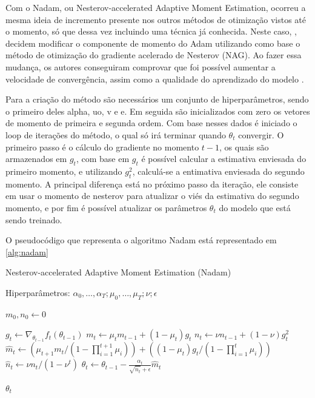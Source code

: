 Com o Nadam, ou Nesterov-accelerated Adaptive Moment Estimation, ocorreu a mesma ideia de incremento presente nos outros métodos de otimização vistos até o momento, só que dessa vez incluindo uma técnica já conhecida. Neste caso, \textcite{NadamMethod}, decidem modificar o componente de momento do Adam utilizando como base o método de otimização do gradiente acelerado de Nesterov (NAG). Ao fazer essa mudança, os autores conseguiram comprovar que foi possível aumentar a velocidade de convergência, assim como a qualidade do aprendizado do modelo \parencite{NadamMethod}.

Para a criação do método são necessários um conjunto de hiperparâmetros, sendo o primeiro deles alpha, uo, v e e. Em seguida são inicializados com zero os vetores de momento de primeira e segunda ordem. Com base nesses dados é iniciado o loop de iterações do método, o qual só irá terminar quando $\theta_t$ convergir. O primeiro passo é o cálculo do gradiente no momento $t-1$, os quais são armazenados em $g_t$, com base em $g_t$ é possível calcular a estimativa enviesada do primeiro momento, e utilizando $g_t^2$, calculá-se a entimativa enviesada do segundo momento. A principal diferença está no próximo passo da iteração, ele consiste em usar o momento de nesterov para atualizar o viés da estimativa do segundo momento, e por fim é possível atualizar os parâmetros $\theta_t$ do modelo que está sendo treinado.

O pseudocódigo que representa o algoritmo Nadam está representado em \ref{alg:nadam}

\begin{algorithm}[H] %
\caption{Nesterov-accelerated Adaptive Moment Estimation (Nadam)}
\label{alg:nadam}
\begin{algorithmic}[1] %

\Require Hiperparâmetros: $\alpha_0, \dots, \alpha_T; \mu_0, \dots, \mu_T; \nu; \epsilon$

\State $m_0, n_0 \leftarrow 0$ 

    \State $g_t \leftarrow \nabla_{\theta_{t-1}} f_t(\theta_{t-1})$ 
    \State $m_t \leftarrow \mu_t m_{t-1} + (1 - \mu_t) g_t$ 
    \State $n_t \leftarrow \nu n_{t-1} + (1 - \nu) g_t^2$ 
    \State $\hat{m}_t \leftarrow (\mu_{t+1} m_t / (1 - \prod_{i=1}^{t+1} \mu_i)) + ((1 - \mu_t) g_t / (1 - \prod_{i=1}^t \mu_i))$ 
    \State $\hat{n}_t \leftarrow \nu n_t / (1 - \nu^t)$ 
    \State $\theta_t \leftarrow \theta_{t-1} - \frac{\alpha_t}{\sqrt{\hat{n}_t} + \epsilon} \hat{m}_t$ 
\EndWhile

\State \Return $\theta_t$
\end{algorithmic}
\end{algorithm}

